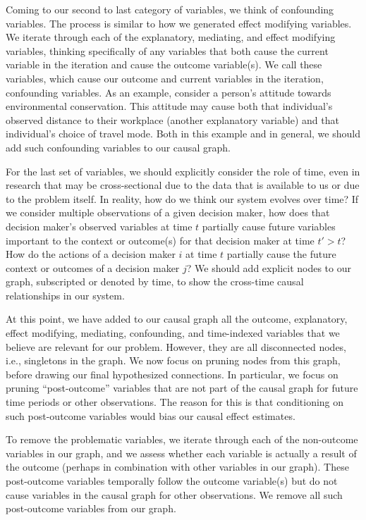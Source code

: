 Coming to our second to last category of variables, we think of confounding variables.
The process is similar to how we generated effect modifying variables.
We iterate through each of the explanatory, mediating, and effect modifying variables, thinking specifically of any variables that both cause the current variable in the iteration and cause the outcome variable(s).
We call these variables, which cause our outcome and current variables in the iteration, confounding variables.
As an example, consider a person's attitude towards environmental conservation.
This attitude may cause both that individual's observed distance to their workplace (another explanatory variable) and that individual's choice of travel mode.
Both in this example and in general, we should add such confounding variables to our causal graph.

For the last set of variables, we should explicitly consider the role of time, even in research that may be cross-sectional due to the data that is available to us or due to the problem itself.
In reality, how do we think our system evolves over time?
If we consider multiple observations of a given decision maker, how does that decision maker's observed variables at time $t$ partially cause future variables important to the context or outcome(s) for that decision maker at time $t' > t$?
How do the actions of a decision maker $i$ at time $t$ partially cause the future context or outcomes of a decision maker $j$?
We should add explicit nodes to our graph, subscripted or denoted by time, to show the cross-time causal relationships in our system.

At this point, we have added to our causal graph all the outcome, explanatory, effect modifying, mediating, confounding, and time-indexed variables that we believe are relevant for our problem.
However, they are all disconnected nodes, i.e., singletons in the graph.
We now focus on pruning nodes from this graph, before drawing our final hypothesized connections.
In particular, we focus on pruning ``post-outcome'' variables that are not part of the causal graph for future time periods or other observations.
The reason for this is that conditioning on such post-outcome variables would bias our causal effect estimates.

To remove the problematic variables, we iterate through each of the non-outcome variables in our graph, and we assess whether each variable is actually a result of the outcome (perhaps in combination with other variables in our graph).
These post-outcome variables temporally follow the outcome variable(s) but do not cause variables in the causal graph for other observations.
We remove all such post-outcome variables from our graph.

